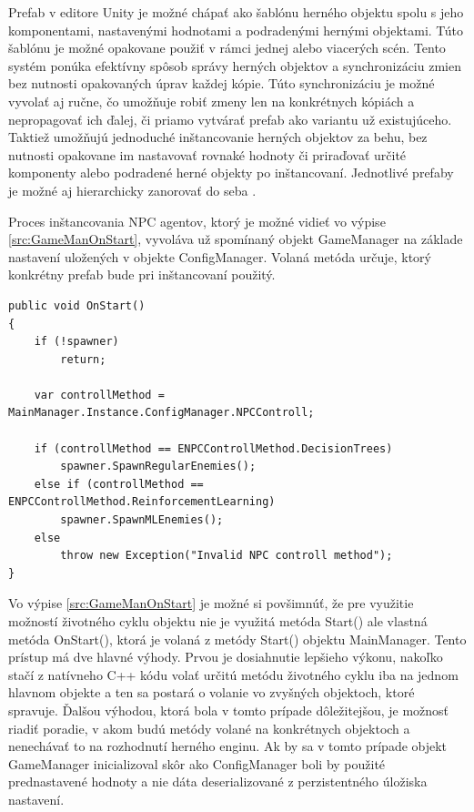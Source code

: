 \documentclass[slovak, master]{diploma}
\begin{document}
Prefab v editore Unity je možné chápať ako šablónu herného objektu spolu s jeho komponentami, nastavenými hodnotami a podradenými hernými objektami. Túto šablónu je možné opakovane použiť v rámci jednej alebo viacerých scén. Tento systém ponúka efektívny spôsob správy herných objektov a synchronizáciu zmien bez nutnosti opakovaných úprav každej kópie. Túto synchronizáciu je možné vyvolať aj ručne, čo umožňuje robiť zmeny len na konkrétnych kópiách a nepropagovať ich ďalej, či priamo vytvárať prefab ako variantu už existujúceho. Taktiež umožňujú jednoduché inštancovanie herných objektov za behu, bez nutnosti opakovane im nastavovať rovnaké hodnoty či priraďovať určité komponenty alebo podradené herné objekty po inštancovaní. Jednotlivé prefaby je možné aj hierarchicky zanorovať do seba \cite{Prefabs}.

Proces inštancovania NPC agentov, ktorý je možné vidieť vo výpise \ref{src:GameManOnStart}, vyvoláva už spomínaný objekt GameManager na základe nastavení uložených v objekte ConfigManager. Volaná metóda určuje, ktorý konkrétny prefab bude pri inštancovaní použitý.

\vspace{8pt}
\begin{lstlisting}[label=src:GameManOnStart,caption={Inštancovanie NPC agentov v závislosti od nastavení}]
public void OnStart() 
{
    if (!spawner)
        return;

    var controllMethod = MainManager.Instance.ConfigManager.NPCControll;

    if (controllMethod == ENPCControllMethod.DecisionTrees)
        spawner.SpawnRegularEnemies();
    else if (controllMethod == ENPCControllMethod.ReinforcementLearning)
        spawner.SpawnMLEnemies();
    else
        throw new Exception("Invalid NPC controll method");
}
\end{lstlisting}

Vo výpise \ref{src:GameManOnStart} je možné si povšimnúť, že pre využitie možností životného cyklu objektu nie je využitá metóda Start() ale vlastná metóda OnStart(), ktorá je volaná z metódy Start() objektu MainManager. Tento prístup má dve hlavné výhody. Prvou je dosiahnutie lepšieho výkonu, nakoľko stačí z natívneho C++ kódu volať určitú metódu životného cyklu iba na jednom hlavnom objekte a ten sa postará o volanie vo zvyšných objektoch, ktoré spravuje. Ďalšou výhodou, ktorá bola v tomto prípade dôležitejšou, je možnosť riadiť poradie, v akom budú metódy volané na konkrétnych objektoch a nenechávať to na rozhodnutí herného enginu. Ak by sa v tomto prípade objekt GameManager inicializoval skôr ako ConfigManager boli by použité prednastavené hodnoty a nie dáta deserializované z perzistentného úložiska nastavení. 
\end{document}
